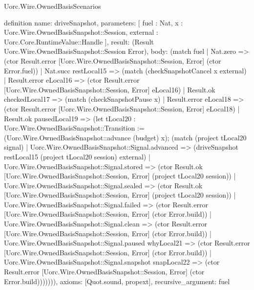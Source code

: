 \begin{lexlean}{Uorc.Wire.OwnedBasisScenarios}
\begin{semanticmodule}
definition{
  name: driveSnapshot,
  parameters: [
    fuel : Nat,
    x : Uorc.Wire.OwnedBasisSnapshot::Session,
    external : Uorc.Core.RuntimeValue::Handle
  ],
  result: (Result Uorc.Wire.OwnedBasisSnapshot::Session Error),
  body: (match fuel
    | Nat.zero => (ctor Result.error [Uorc.Wire.OwnedBasisSnapshot::Session, Error] (ctor Error.fuel))
    | Nat.succ restLocal15 => (match (checkSnapshotCancel x external)
      | Result.error eLocal16 => (ctor Result.error [Uorc.Wire.OwnedBasisSnapshot::Session, Error] eLocal16)
      | Result.ok checkedLocal17 => (match (checkSnapshotPause x)
        | Result.error eLocal18 => (ctor Result.error [Uorc.Wire.OwnedBasisSnapshot::Session, Error] eLocal18)
        | Result.ok pausedLocal19 => (let tLocal20 : Uorc.Wire.OwnedBasisSnapshot::Transition := (Uorc.Wire.OwnedBasisSnapshot::advance (budget) x); (match (project tLocal20 signal)
          | Uorc.Wire.OwnedBasisSnapshot::Signal.advanced => (driveSnapshot restLocal15 (project tLocal20 session) external)
          | Uorc.Wire.OwnedBasisSnapshot::Signal.stored => (ctor Result.ok [Uorc.Wire.OwnedBasisSnapshot::Session, Error] (project tLocal20 session))
          | Uorc.Wire.OwnedBasisSnapshot::Signal.sealed => (ctor Result.ok [Uorc.Wire.OwnedBasisSnapshot::Session, Error] (project tLocal20 session))
          | Uorc.Wire.OwnedBasisSnapshot::Signal.failed => (ctor Result.error [Uorc.Wire.OwnedBasisSnapshot::Session, Error] (ctor Error.build))
          | Uorc.Wire.OwnedBasisSnapshot::Signal.clean => (ctor Result.error [Uorc.Wire.OwnedBasisSnapshot::Session, Error] (ctor Error.build))
          | Uorc.Wire.OwnedBasisSnapshot::Signal.paused whyLocal21 => (ctor Result.error [Uorc.Wire.OwnedBasisSnapshot::Session, Error] (ctor Error.build))
          | Uorc.Wire.OwnedBasisSnapshot::Signal.snapshot snapLocal22 => (ctor Result.error [Uorc.Wire.OwnedBasisSnapshot::Session, Error] (ctor Error.build))))))),
  axioms: [Quot.sound, propext],
  recursive_argument: fuel
}


\end{semanticmodule}
\end{lexlean}
